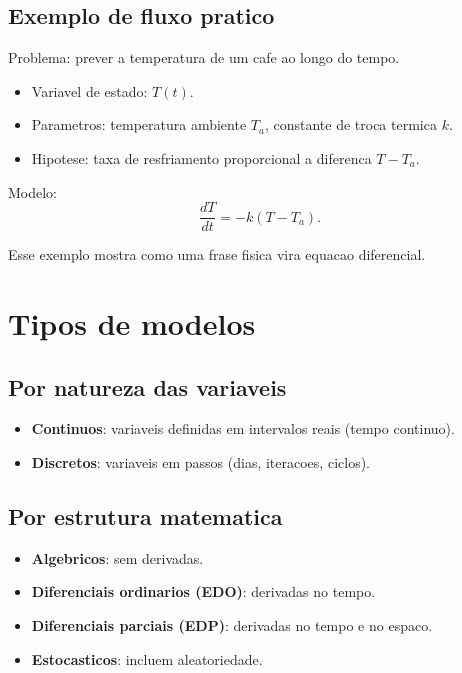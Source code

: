 \documentclass[12pt,a4paper,oneside]{book}
\theoremstyle{definition}
\begin{document}
\subsection{Exemplo de fluxo pratico}

Problema: prever a temperatura de um cafe ao longo do tempo.

\begin{itemize}
    \item Variavel de estado: $T(t)$.
    \item Parametros: temperatura ambiente $T_a$, constante de troca termica $k$.
    \item Hipotese: taxa de resfriamento proporcional a diferenca $T-T_a$.
\end{itemize}

Modelo:
\begin{equation}
\frac{dT}{dt}=-k(T-T_a).
\end{equation}

Esse exemplo mostra como uma frase fisica vira equacao diferencial.

\section{Tipos de modelos}

\subsection{Por natureza das variaveis}

\begin{itemize}
    \item \textbf{Continuos}: variaveis definidas em intervalos reais (tempo continuo).
    \item \textbf{Discretos}: variaveis em passos (dias, iteracoes, ciclos).
\end{itemize}

\subsection{Por estrutura matematica}

\begin{itemize}
    \item \textbf{Algebricos}: sem derivadas.
    \item \textbf{Diferenciais ordinarios (EDO)}: derivadas no tempo.
    \item \textbf{Diferenciais parciais (EDP)}: derivadas no tempo e no espaco.
    \item \textbf{Estocasticos}: incluem aleatoriedade.
\end{itemize}
\end{document}
